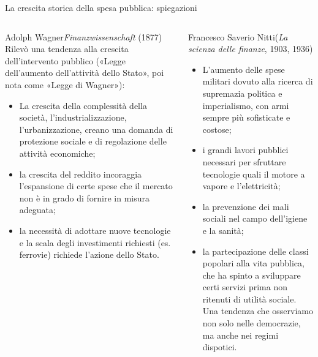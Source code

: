 \documentclass[aspectratio=64,12pt]{beamer}
\begin{document}
\begin{frame}{La crescita storica della spesa pubblica: spiegazioni}
\begin{resize}{.9}
\begin{columns}
\begin{column}{.5\columnwidth}
\begin{block}{Adolph Wagner\newline\footnotesize \emph{Finanzwissenschaft} (1877)}
\footnotesize
Rilevò una tendenza alla crescita dell’intervento pubblico («Legge dell’aumento dell’attività dello Stato», poi nota come «Legge di Wagner»):
\begin{itemize}
\item La crescita della complessità della società, l’industrializzazione, l’urbanizzazione, creano una domanda di protezione sociale e di regolazione delle attività economiche;
\item la crescita del reddito incoraggia l’espansione di certe spese che il mercato non è in grado di fornire in misura adeguata;
\item la necessità di adottare nuove tecnologie e la scala degli investimenti richiesti (es. ferrovie) richiede l’azione dello Stato.
\end{itemize}
\end{block}
\end{column}
\begin{column}{.5\columnwidth}
\begin{block}{Francesco Saverio Nitti\newline\footnotesize (\emph{La scienza delle finanze}, 1903, 1936)}
\footnotesize
\begin{itemize}
\item L’aumento delle spese militari dovuto alla ricerca di supremazia politica e imperialismo, con armi sempre più sofisticate e costose;
\item i grandi lavori pubblici necessari per sfruttare tecnologie quali il motore a vapore e l’elettricità;
\item la prevenzione dei mali sociali nel campo dell’igiene e la sanità;
\item la partecipazione delle classi popolari alla vita pubblica, che ha spinto a sviluppare certi servizi prima non ritenuti di utilità sociale.\\[0pt]
Una tendenza che osserviamo non solo nelle democrazie, ma anche nei regimi dispotici.
\end{itemize}
\end{block}
\end{column}
\end{columns}
\end{resize}
\end{frame}
\end{document}

